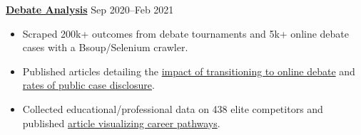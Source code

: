 \textbf{\href{https://github.com/petezh/E-Debate}{Debate Analysis}} \hfill Sep 2020--Feb 2021\par
\begin{itemize}
	\item Scraped 200k+ outcomes from debate tournaments and 5k+ online debate cases with a Bsoup/Selenium crawler.
	\item Published articles detailing the \href{https://www.vbriefly.com/2020/12/31/five-trends-among-e-debate-competitors-by-peter-zhang/}{impact of transitioning to online debate} and \href{https://www.vbriefly.com/2021/01/22/disclosure-in-numbers-by-peter-zhang/}{rates of public case disclosure}.
	\item Collected educational/professional data on 438 elite competitors and published \href{https://www.vbriefly.com/2021/12/28/where-are-they-now-debate-career-pathways/}{article visualizing career pathways}.
	\end{itemize}\vspace{0.1cm}\par